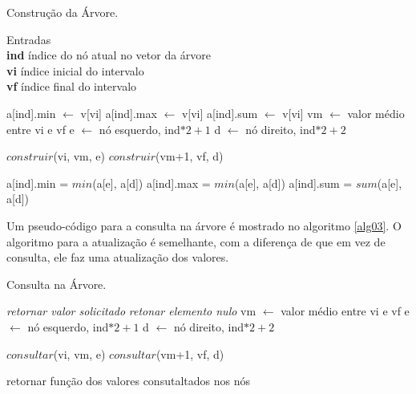 \documentclass[10pt,a4paper]{article}
\begin{document}
    \begin{algorithm}[H]
    	\caption{Construção da Árvore.}
    	\label{alg02}

		Entradas \\
		\textbf{ind} índice do nó atual no vetor da árvore \\
		\textbf{vi} índice inicial do intervalo \\
		\textbf{vf} índice final do intervalo \\

    	\begin{algorithmic}[1]
    			\State a[ind].min $\gets$ v[vi]
    			\State a[ind].max $\gets$ v[vi]
    			\State a[ind].sum $\gets$ v[vi]
    		\Else
    			\State vm $\gets$ valor médio entre vi e vf
    			\State e $\gets$ nó esquerdo, ind$*2+1$
    			\State d $\gets$ nó direito, ind$*2+2$

    			\State $construir$(vi, vm, e) 
    			\State $construir$(vm+1, vf, d) 

    			\State a[ind].min = $min$(a[e], a[d])
    			\State a[ind].max = $min$(a[e], a[d])
    			\State a[ind].sum = $sum$(a[e], a[d])
    		\EndIf
		\end{algorithmic}
        
    \end{algorithm}

    Um pseudo-código para a consulta na árvore é mostrado no algoritmo \ref{alg03}. O algoritmo para a atualização é semelhante, com a diferença de que em vez de consulta, ele faz uma atualização dos valores.

    \begin{algorithm}[H]
    	\caption{Consulta na Árvore.}
    	\label{alg03}

    	\begin{algorithmic}[1]
    			\State \textit{retornar valor solicitado}
    			\State \textit{retonar elemento nulo}
			\Else
    			\State vm $\gets$ valor médio entre vi e vf
    			\State e $\gets$ nó esquerdo, ind$*2+1$
    			\State d $\gets$ nó direito, ind$*2+2$

    			\State $consultar$(vi, vm, e) 
    			\State $consultar$(vm+1, vf, d) 

				\State retornar função dos valores consutaltados nos nós
    		\EndIf
		\end{algorithmic}
        
    \end{algorithm}
\end{document}
